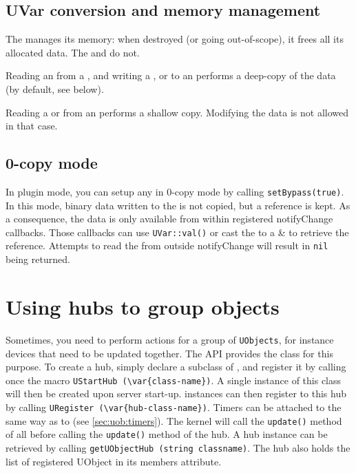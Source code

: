\subsection{UVar conversion and memory management}
The \UBinary manages its memory: when destroyed (or going out-of-scope), it
frees all its allocated data. The \USound and \UImage do not.

Reading an \UBinary from a \UVar, and writing a
\UBinary, \USound or \UImage to an \UVar performs a deep-copy of the
data (by default, see below).

Reading a \USound or \UImage from an \UVar performs a shallow copy. Modifying
the data is not allowed in that case.

\subsection{0-copy mode}
In plugin mode, you can setup any \UVar in 0-copy mode by calling
\lstinline{setBypass(true)}. In this mode, binary data written to the \UVar
is not copied, but a reference is kept.
As a consequence, the data is only available from within registered
notifyChange callbacks. Those callbacks can use \lstinline|UVar::val()| or
cast the \UVar to a \UBinary\& to retrieve the reference.
Attempts to read the \UVar from outside notifyChange will result in
\lstinline{nil} being returned.

\section{Using hubs to group objects}

Sometimes, you need to perform actions for a group of
\lstinline{UObjects}, for instance devices that need to be updated
together. The API provides the \UObjectHub class for this
purpose. To create a hub, simply declare a subclass of
\UObjectHub, and register it by calling once the macro
\lstinline|UStartHub (\var{class-name})|. A single instance of this class
will then be created upon server start-up. \UObject
instances can then register to this hub by calling
\lstinline|URegister (\var{hub-class-name})|. Timers can be attached to
\UObjectHub the same way as to \UObject (see
\autoref{sec:uob:timers}). The kernel will call the \lstinline{update()}
method of all \UObject before calling the
\lstinline{update()} method of the hub. A hub instance can be
retrieved by calling \lstinline{getUObjectHub (string classname)}. The
hub also holds the list of registered UObject in its members
attribute.

